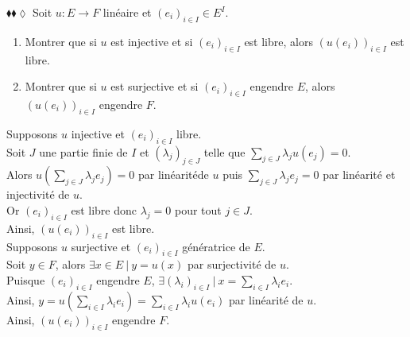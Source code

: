 \documentclass[11pt]{article}
\begin{document}
\vspace*{-0.3cm}

\begin{exercice}{$\blacklozenge\blacklozenge\lozenge$}{}
    Soit $u:E\to F$ linéaire et $(e_i)_{i\in I} \in E^I$.
    \begin{enumerate}
        \item Montrer que si $u$ est injective et si $(e_i)_{i\in I}$ est libre, alors $(u(e_i))_{i\in I}$ est libre.
        \item Montrer que si $u$ est surjective et si $(e_i)_{i\in I}$ engendre $E$, alors $(u(e_i))_{i\in I}$ engendre $F$.
    \end{enumerate}
    \tcblower
     Supposons $u$ injective et $(e_i)_{i\in I}$ libre.\\
    Soit $J$ une partie finie de $I$ et $(\lambda_j)_{j\in J}$ telle que $\sum_{j\in J} \lambda_ju(e_j) = 0$.\\
    Alors $u\left(\sum_{j\in J} \lambda_je_j\right) = 0$ par linéaritéde $u$ puis $\sum_{j\in J}\lambda_j e_j = 0$ par linéarité et injectivité de $u$.\\
    Or $(e_i)_{i\in I}$ est libre donc $\lambda_j = 0$ pour tout $j\in J$.\\
    Ainsi, $(u(e_i))_{i\in I}$ est libre.\\[0.3cm]
     Supposons $u$ surjective et $(e_i)_{i\in I}$ génératrice de $E$.\\
    Soit $y\in F$, alors $\exists x\in E ~ | ~ y = u(x)$ par surjectivité de $u$.\\
    Puisque $(e_i)_{i\in I}$ engendre $E$, $\exists (\lambda_i)_{i\in I} ~ | ~ x = \sum_{i\in I}\lambda_ie_i$.\\
    Ainsi, $y = u\left(\sum_{i\in I}\lambda_ie_i\right) = \sum_{i\in I}\lambda_iu(e_i)$ par linéarité de $u$.\\
    Ainsi, $(u(e_i))_{i\in I}$ engendre $F$.
\end{exercice}

\vspace*{-0.3cm}
\end{document}
